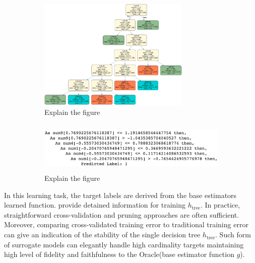 \documentclass{article}
\begin{document}
\begin{figure}[htb]
	\begin{subfigure}[tb]{.5\textwidth}
		\begin{center}
			\includegraphics[height=150pt, width=\linewidth]{img/simple_tree_prepruned_simulated.png}
			\caption{Explain the figure}
			\label{fig:surrogate_dt}
		\end{center}
	\end{subfigure}%
	\begin{subfigure}[tb]{.5\textwidth}
		\begin{center}
			\includegraphics[height=70pt, width=\linewidth]{img/decision_stumps_txt.png}
			\caption{Explain the figure}
			\label{fig:surrogate_dt}
		\end{center}
	\end{subfigure}%
	\caption{}
\end{figure}

In this learning task, the target labels are derived from the base estimators learned function. \cite{dt_surrogate1} \cite{dt_surrogate2} provide detained information for training $h_{\text{tree}}$. In practice, straightforward cross-validation and pruning approaches are often sufficient. Moreover, comparing cross-validated training error to traditional training error can give an indication of the stability of the single decision tree $h_{\text{tree}}$. Such form of surrogate models can elegantly handle high cardinality targets maintaining high level of fidelity and faithfulness to the Oracle(base estimator function $g$).
\end{document}
